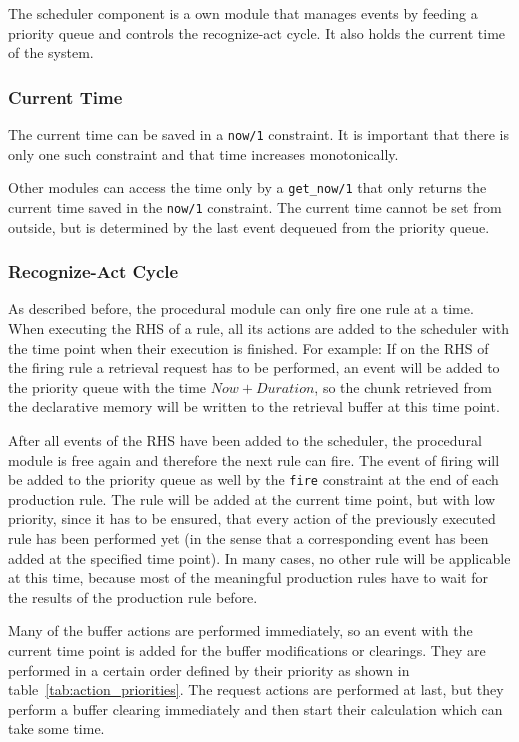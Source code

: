 The scheduler component is a own module that manages events by feeding a priority queue and controls the recognize-act cycle. It also holds the current time of the system. 

\subsubsection{Current Time}

The current time can be saved in a \verb|now/1| constraint. It is important that there is only one such constraint and that time increases monotonically.

Other modules can access the time only by a \verb|get_now/1| that only returns the current time saved in the \verb|now/1| constraint. The current time cannot be set from outside, but is determined by the last event dequeued from the priority queue.

\subsubsection{Recognize-Act Cycle}

As described before, the procedural module can only fire one rule at a time. When executing the RHS of a rule, all its actions are added to the scheduler with the time point when their execution is finished. For example: If on the RHS of the firing rule a retrieval request has to be performed, an event will be added to the priority queue with the time $Now + Duration$, so the chunk retrieved from the declarative memory will be written to the retrieval buffer at this time point.

After all events of the RHS have been added to the scheduler, the procedural module is free again and therefore the next rule can fire. The event of firing will be added to the priority queue as well by the \verb|fire| constraint at the end of each production rule. The rule will be added at the current time point, but with low priority, since it has to be ensured, that every action of the previously executed rule has been performed yet (in the sense that a corresponding event has been added at the specified time point). In many cases, no other rule will be applicable at this time, because most of the meaningful production rules have to wait for the results of the production rule before. 

Many of the buffer actions are performed immediately, so an event with the current time point is added for the buffer modifications or clearings. They are performed in a certain order defined by their priority as shown in table~\ref{tab:action_priorities}. The request actions are performed at last, but they perform a buffer clearing immediately and then start their calculation which can take some time. 

